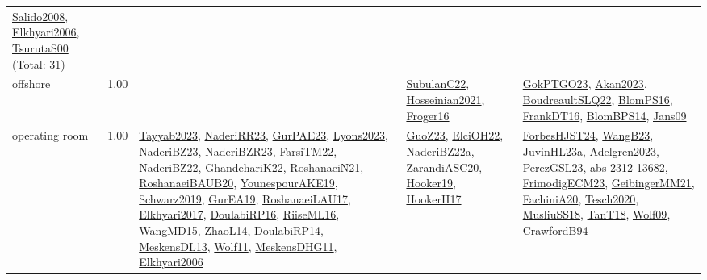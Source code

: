 {\begin{longtable}{p{3cm}r>{\raggedright\arraybackslash}p{6cm}>{\raggedright\arraybackslash}p{6cm}>{\raggedright\arraybackslash}p{8cm}}
\hyperref[detail:Salido2008]{Salido2008}, \hyperref[detail:Elkhyari2006]{Elkhyari2006}, \hyperref[detail:TsurutaS00]{TsurutaS00} (Total: 31)\\
\index{offshore}\index{ApplicationAreas!offshore}offshore &  1.00 &  & \hyperref[detail:SubulanC22]{SubulanC22}, \hyperref[detail:Hosseinian2021]{Hosseinian2021}, \hyperref[detail:Froger16]{Froger16} & \hyperref[detail:GokPTGO23]{GokPTGO23}, \hyperref[detail:Akan2023]{Akan2023}, \hyperref[detail:BoudreaultSLQ22]{BoudreaultSLQ22}, \hyperref[detail:BlomPS16]{BlomPS16}, \hyperref[detail:FrankDT16]{FrankDT16}, \hyperref[detail:BlomBPS14]{BlomBPS14}, \hyperref[detail:Jans09]{Jans09}\\
\index{operating room}\index{ApplicationAreas!operating room}operating room &  1.00 & \hyperref[detail:Tayyab2023]{Tayyab2023}, \hyperref[detail:NaderiRR23]{NaderiRR23}, \hyperref[detail:GurPAE23]{GurPAE23}, \hyperref[detail:Lyons2023]{Lyons2023}, \hyperref[detail:NaderiBZ23]{NaderiBZ23}, \hyperref[detail:NaderiBZR23]{NaderiBZR23}, \hyperref[detail:FarsiTM22]{FarsiTM22}, \hyperref[detail:NaderiBZ22]{NaderiBZ22}, \hyperref[detail:GhandehariK22]{GhandehariK22}, \hyperref[detail:RoshanaeiN21]{RoshanaeiN21}, \hyperref[detail:RoshanaeiBAUB20]{RoshanaeiBAUB20}, \hyperref[detail:YounespourAKE19]{YounespourAKE19}, \hyperref[detail:Schwarz2019]{Schwarz2019}, \hyperref[detail:GurEA19]{GurEA19}, \hyperref[detail:RoshanaeiLAU17]{RoshanaeiLAU17}, \hyperref[detail:Elkhyari2017]{Elkhyari2017}, \hyperref[detail:DoulabiRP16]{DoulabiRP16}, \hyperref[detail:RiiseML16]{RiiseML16}, \hyperref[detail:WangMD15]{WangMD15}, \hyperref[detail:ZhaoL14]{ZhaoL14}, \hyperref[detail:DoulabiRP14]{DoulabiRP14}, \hyperref[detail:MeskensDL13]{MeskensDL13}, \hyperref[detail:Wolf11]{Wolf11}, \hyperref[detail:MeskensDHG11]{MeskensDHG11}, \hyperref[detail:Elkhyari2006]{Elkhyari2006} & \hyperref[detail:GuoZ23]{GuoZ23}, \hyperref[detail:ElciOH22]{ElciOH22}, \hyperref[detail:NaderiBZ22a]{NaderiBZ22a}, \hyperref[detail:ZarandiASC20]{ZarandiASC20}, \hyperref[detail:Hooker19]{Hooker19}, \hyperref[detail:HookerH17]{HookerH17} & \hyperref[detail:ForbesHJST24]{ForbesHJST24}, \hyperref[detail:WangB23]{WangB23}, \hyperref[detail:JuvinHL23a]{JuvinHL23a}, \hyperref[detail:Adelgren2023]{Adelgren2023}, \hyperref[detail:PerezGSL23]{PerezGSL23}, \hyperref[detail:abs-2312-13682]{abs-2312-13682}, \hyperref[detail:FrimodigECM23]{FrimodigECM23}, \hyperref[detail:GeibingerMM21]{GeibingerMM21}, \hyperref[detail:FachiniA20]{FachiniA20}, \hyperref[detail:Tesch2020]{Tesch2020}, \hyperref[detail:MusliuSS18]{MusliuSS18}, \hyperref[detail:TanT18]{TanT18}, \hyperref[detail:Wolf09]{Wolf09}, \hyperref[detail:CrawfordB94]{CrawfordB94}\\

\end{longtable}}
